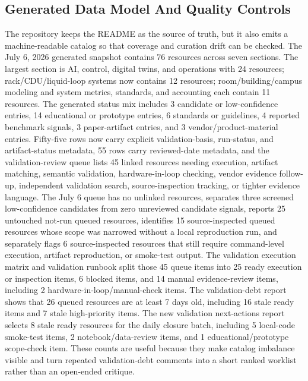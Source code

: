 \documentclass[11pt]{article}
\begin{document}
\subsection{Generated Data Model And Quality Controls}

The repository keeps the README as the source of truth, but it also emits a machine-readable catalog so that coverage and curation drift can be checked. The July 6, 2026 generated snapshot contains 76 resources across seven sections. The largest section is AI, control, digital twins, and operations with 24 resources; rack/CDU/liquid-loop systems now contains 12 resources; room/building/campus modeling and system metrics, standards, and accounting each contain 11 resources. The generated status mix includes 3 candidate or low-confidence entries, 14 educational or prototype entries, 6 standards or guidelines, 4 reported benchmark signals, 3 paper-artifact entries, and 3 vendor/product-material entries. Fifty-five rows now carry explicit validation-basis, run-status, and artifact-status metadata, 55 rows carry reviewed-date metadata, and the validation-review queue lists 45 linked resources needing execution, artifact matching, semantic validation, hardware-in-loop checking, vendor evidence follow-up, independent validation search, source-inspection tracking, or tighter evidence language. The July 6 queue has no unlinked resources, separates three screened low-confidence candidates from zero unreviewed candidate signals, reports 25 untouched not-run queued resources, identifies 15 source-inspected queued resources whose scope was narrowed without a local reproduction run, and separately flags 6 source-inspected resources that still require command-level execution, artifact reproduction, or smoke-test output. The validation execution matrix and validation runbook split those 45 queue items into 25 ready execution or inspection items, 6 blocked items, and 14 manual evidence-review items, including 2 hardware-in-loop/manual-check items. The validation-debt report shows that 26 queued resources are at least 7 days old, including 16 stale ready items and 7 stale high-priority items. The new validation next-actions report selects 8 stale ready resources for the daily closure batch, including 5 local-code smoke-test items, 2 notebook/data-review items, and 1 educational/prototype scope-check item. These counts are useful because they make catalog imbalance visible and turn repeated validation-debt comments into a short ranked worklist rather than an open-ended critique.
\end{document}
